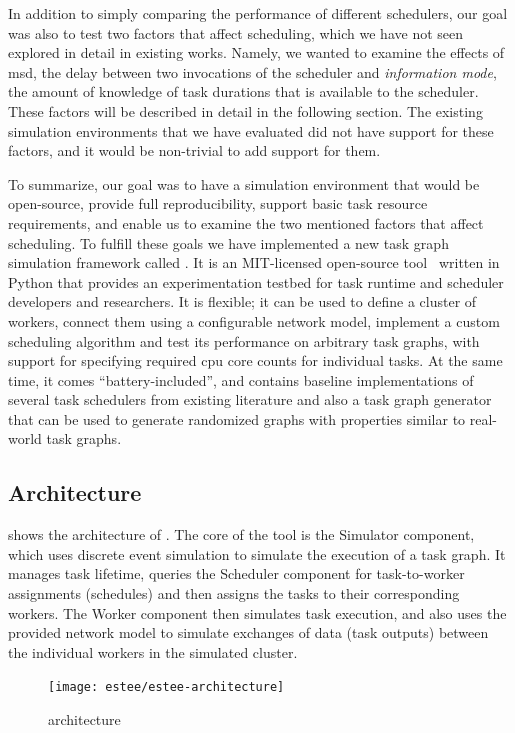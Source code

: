 In addition to simply comparing the performance of different schedulers, our goal was also to test
two factors that affect scheduling, which we have not seen explored in detail in existing works.
Namely, we wanted to examine the effects of \gls{msd}, the delay between two
invocations of the scheduler and \emph{information mode}, the amount of knowledge of task durations
that is available to the scheduler. These factors will be described in detail in the following
section. The existing simulation environments that we have evaluated did not have support for these
factors, and it would be non-trivial to add support for them.

To summarize, our goal was to have a simulation environment that would be open-source, provide
full reproducibility, support basic task resource requirements, and enable us to examine
the two mentioned factors that affect scheduling. To fulfill these goals we have implemented a new
task graph simulation framework called \estee{}. It is an \mbox{MIT-licensed}
open-source tool~\cite{estee_github} written in Python that provides an experimentation testbed
for task runtime and scheduler developers and researchers. It is flexible; it can be used to define
a cluster of workers, connect them using a configurable network model, implement a custom
scheduling algorithm and test its performance on arbitrary task graphs, with support for specifying
required \gls{cpu} core counts for individual tasks. At the same time, it comes
``battery-included'', and contains baseline implementations of several task schedulers from
existing literature and also a task graph generator that can be used to generate randomized graphs
with properties similar to real-world task graphs.

\subsection{Architecture}
 shows the architecture of \estee{}. The core of the
tool is the Simulator component, which uses discrete event simulation to simulate the execution of
a task graph. It manages task lifetime, queries the Scheduler component for task-to-worker
assignments (schedules) and then assigns the tasks to their corresponding workers. The Worker
component then simulates task execution, and also uses the provided network model to simulate
exchanges of data (task outputs) between the individual workers in the simulated cluster.

\begin{figure}
	\centering
	\texttt{[image: estee/estee-architecture]}
	\caption{\estee{} architecture}
	\label{fig:estee-architecture}
\end{figure}

